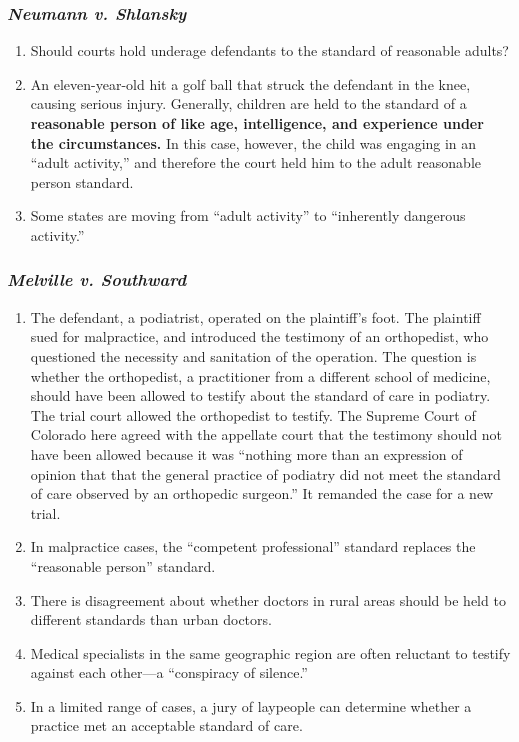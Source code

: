 \subsubsection{\emph{Neumann v. Shlansky}}

\begin{enumerate}
    \item Should courts hold underage defendants to the standard of reasonable adults?
    \item An eleven-year-old hit a golf ball that struck the defendant in the knee, causing serious injury. Generally, children are held to the standard of a \textbf{reasonable person of like age, intelligence, and experience under the circumstances.} In this case, however, the child was engaging in an ``adult activity,'' and therefore the court held him to the adult reasonable person standard.
    \item Some states are moving from ``adult activity'' to ``inherently dangerous activity.''
\end{enumerate}

\subsubsection{\emph{Melville v. Southward}}

\begin{enumerate}
    \item The defendant, a podiatrist, operated on the plaintiff's foot. The plaintiff sued for malpractice, and introduced the testimony of an orthopedist, who questioned the necessity and sanitation of the operation. The question is whether the orthopedist, a practitioner from a different school of medicine, should have been allowed to testify about the standard of care in podiatry. The trial court allowed the orthopedist to testify. The Supreme Court of Colorado here agreed with the appellate court that the testimony should not have been allowed because it was ``nothing more than an expression of opinion that that the general practice of podiatry did not meet the standard of care observed by an orthopedic surgeon.'' It remanded the case for a new trial.
    \item In malpractice cases, the ``competent professional'' standard replaces the ``reasonable person'' standard.
    \item There is disagreement about whether doctors in rural areas should be held to different standards than urban doctors.
    \item Medical specialists in the same geographic region are often reluctant to testify against each other---a ``conspiracy of silence.''
    \item In a limited range of cases, a jury of laypeople can determine whether a practice met an acceptable standard of care.
\end{enumerate}

